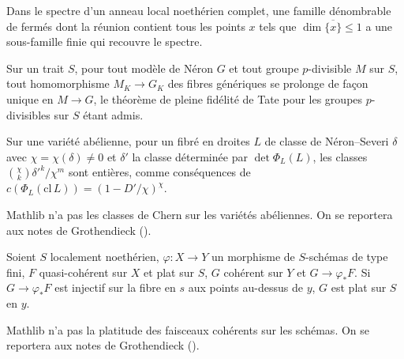 \begin{encadre}
\begin{theoreme*}\nonverifie
Dans le spectre d'un anneau local noethérien complet, une famille dénombrable de fermés dont la réunion contient tous les points $x$ tels que $\dim \overline{\{x\}} \leq 1$ a une sous-famille finie qui recouvre le spectre.
\end{theoreme*}
\end{encadre}

\begin{encadre}
\begin{theoreme*}\nonverifie
Sur un trait $S$, pour tout modèle de Néron $G$ et tout groupe $p$-divisible $M$ sur $S$, tout homomorphisme $M_K \to G_K$ des fibres génériques se prolonge de façon unique en $M \to G$, le théorème de pleine fidélité de Tate pour les groupes $p$-divisibles sur $S$ étant admis.
\end{theoreme*}
\end{encadre}

\begin{encadre}
\begin{conjecture*}
Sur une variété abélienne, pour un fibré en droites $L$ de classe de Néron--Severi $\delta$ avec $\chi = \chi(\delta) \neq 0$ et $\delta'$ la classe déterminée par $\det \Phi_L(L)$, les classes $\binom{\chi}{k}\delta'^k/\chi^m$ sont entières, comme conséquences de $c(\Phi_L(\mathrm{cl}\,L)) = (1 - D'/\chi)^\chi$.
\end{conjecture*}
\end{encadre}
{\small Mathlib n'a pas les classes de Chern sur les variétés abéliennes. On se reportera aux notes de Grothendieck ().\par}

\begin{encadre}
\begin{conjecture*}
Soient $S$ localement noethérien, $\varphi : X \to Y$ un morphisme de $S$-schémas de type fini, $F$ quasi-cohérent sur $X$ et plat sur $S$, $G$ cohérent sur $Y$ et $G \to \varphi_*F$. Si $G \to \varphi_*F$ est injectif sur la fibre en $s$ aux points au-dessus de $y$, $G$ est plat sur $S$ en $y$.
\end{conjecture*}
\end{encadre}
{\small Mathlib n'a pas la platitude des faisceaux cohérents sur les schémas. On se reportera aux notes de Grothendieck ().\par}

